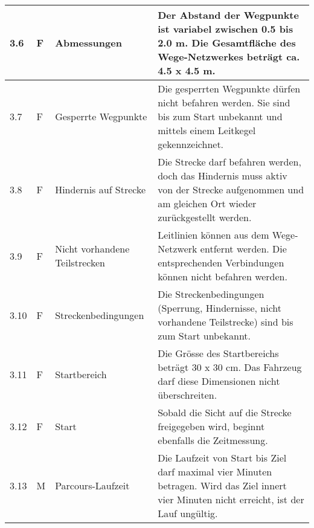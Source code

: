 \documentclass[main.tex]{subfiles} %
\begin{document}
\begin{tabular}{|l|p{0.5cm}|p{4cm}|p{10cm}|}
  \hline
  3.6          & F          & Abmessungen                   & Der Abstand der Wegpunkte ist variabel zwischen 0.5 bis 2.0 m. Die Gesamtfläche des Wege-Netzwerkes beträgt ca. 4.5 x 4.5 m.                                                                                         \\
  \hline
  3.7          & F          & Gesperrte Wegpunkte           & Die gesperrten Wegpunkte dürfen nicht befahren werden. Sie sind bis zum Start unbekannt und mittels einem Leitkegel gekennzeichnet.                                                                                  \\
  \hline
  3.8          & F          & Hindernis auf Strecke         & Die Strecke darf befahren werden, doch das Hindernis muss aktiv von der Strecke aufgenommen und am gleichen Ort wieder zurückgestellt werden.                                                                        \\
  \hline
  3.9          & F          & Nicht vorhandene Teilstrecken & Leitlinien können aus dem Wege-Netzwerk entfernt werden. Die entsprechenden Verbindungen können nicht befahren werden.                                                                                               \\
  \hline
  3.10         & F          & Streckenbedingungen           & Die Streckenbedingungen (Sperrung, Hindernisse, nicht vorhandene Teilstrecke) sind bis zum Start unbekannt.                                                                                                          \\
  \hline
  3.11         & F          & Startbereich                  & Die Grösse des Startbereichs beträgt 30 x 30 cm. Das Fahrzeug darf diese Dimensionen nicht überschreiten.                                                                                                            \\
  \hline
  3.12         & F          & Start                         & Sobald die Sicht auf die Strecke freigegeben wird, beginnt ebenfalls die Zeitmessung.                                                                                                                                \\
  \hline
  3.13         & M          & Parcours-Laufzeit             & Die Laufzeit von Start bis Ziel darf maximal vier Minuten betragen. Wird das Ziel innert vier Minuten nicht erreicht, ist der Lauf ungültig.                                                                         \\
  \hline
\end{tabular}
\end{document}
